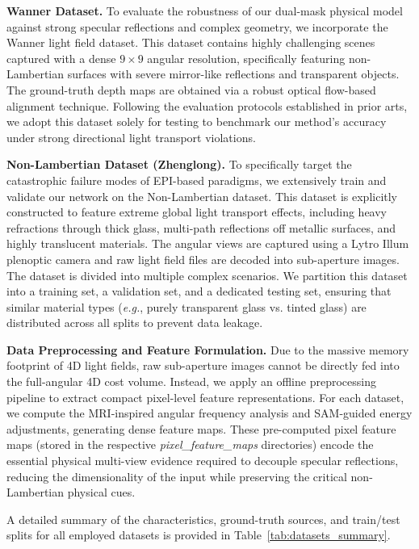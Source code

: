 \documentclass[lettersize,journal]{IEEEtran}
\begin{document}
\textbf{Wanner Dataset.} 
To evaluate the robustness of our dual-mask physical model against strong specular reflections and complex geometry, we incorporate the Wanner light field dataset. This dataset contains highly challenging scenes captured with a dense $9 \times 9$ angular resolution, specifically featuring non-Lambertian surfaces with severe mirror-like reflections and transparent objects. The ground-truth depth maps are obtained via a robust optical flow-based alignment technique. Following the evaluation protocols established in prior arts, we adopt this dataset solely for testing to benchmark our method's accuracy under strong directional light transport violations.

\textbf{Non-Lambertian Dataset (Zhenglong).} 
To specifically target the catastrophic failure modes of EPI-based paradigms, we extensively train and validate our network on the Non-Lambertian dataset. This dataset is explicitly constructed to feature extreme global light transport effects, including heavy refractions through thick glass, multi-path reflections off metallic surfaces, and highly translucent materials. The angular views are captured using a Lytro Illum plenoptic camera and raw light field files are decoded into sub-aperture images. The dataset is divided into multiple complex scenarios. We partition this dataset into a training set, a validation set, and a dedicated testing set, ensuring that similar material types (\textit{e.g.}, purely transparent glass vs. tinted glass) are distributed across all splits to prevent data leakage. 

\textbf{Data Preprocessing and Feature Formulation.} 
Due to the massive memory footprint of 4D light fields, raw sub-aperture images cannot be directly fed into the full-angular 4D cost volume. Instead, we apply an offline preprocessing pipeline to extract compact pixel-level feature representations. For each dataset, we compute the MRI-inspired angular frequency analysis and SAM-guided energy adjustments, generating dense feature maps. These pre-computed pixel feature maps (stored in the respective \textit{pixel\_feature\_maps} directories) encode the essential physical multi-view evidence required to decouple specular reflections, reducing the dimensionality of the input while preserving the critical non-Lambertian physical cues.

A detailed summary of the characteristics, ground-truth sources, and train/test splits for all employed datasets is provided in Table~\ref{tab:datasets_summary}.
\end{document}

